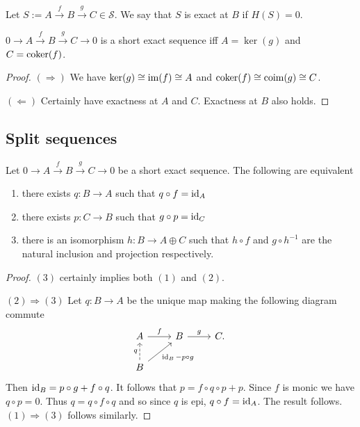 \documentclass{memoir}
\begin{document}
\begin{definition}
    Let $S := A\xrightarrow{f} B\xrightarrow{g} C\in\mathcal S$.
    We say that $S$ is exact at $B$ if $H(S) = 0$.
\end{definition}
\begin{proposition}
    $0\rightarrow A \xrightarrow{f} B \xrightarrow{g} C \rightarrow 0$ is a short exact sequence iff $A = \ker(g)$ and $C = \operatorname{coker}(f)$.
\end{proposition}
\begin{proof}
    $(\Rightarrow)$ We have $\ker(g) \cong \operatorname{im}(f) \cong A$ and $\operatorname{coker}(f) \cong \operatorname{coim}(g) \cong C$.

    $(\Leftarrow)$ Certainly have exactness at $A$ and $C$. Exactness at $B$ also holds.
\end{proof}
\subsection{Split sequences}
\begin{thm}
    Let $0\rightarrow A \xrightarrow{f} B \xrightarrow{g} C \rightarrow 0$ be a short exact sequence.
    The following are equivalent
    \begin{enumerate}
        \item there exists $q:B\to A$ such that $q\circ f = \operatorname{id}_A$
        \item there exists $p:C\to B$ such that $g\circ p = \operatorname{id}_C$
        \item there is an isomorphism $h:B\to A\oplus C$ such that $h\circ f$ and $g\circ h^{-1}$ are the natural inclusion and projection respectively.
    \end{enumerate}
\end{thm}
\begin{proof}
    $(3)$ certainly implies both $(1)$ and $(2)$.

    $(2)\Rightarrow(3)$ Let $q:B\to A$ be the unique map making the following diagram commute
    \begin{equation}
        \begin{tikzcd}
            A \arrow[r,"f"] & B \arrow[r,"g"] & C. \\
            B \arrow[ur,swap,"\id_B-p\circ g"] \arrow[u,dashed,"q"] & &
        \end{tikzcd}
    \end{equation}
    Then $\operatorname{id}_B = p\circ g + f\circ q$.
    It follows that $p = f\circ q\circ p + p$.
    Since $f$ is monic we have $q\circ p = 0$.
    Thus $q = q\circ f\circ q$ and so since $q$ is epi, $q\circ f = \operatorname{id}_A$.
    The result follows. $(1)\Rightarrow(3)$ follows similarly.
\end{proof}
\end{document}
